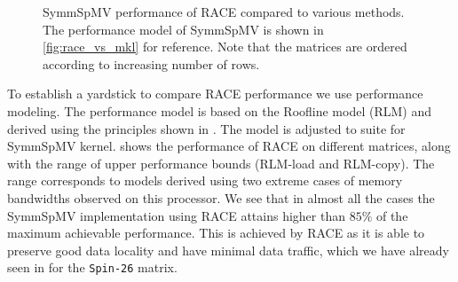 \begin{figure}[tb]
	\caption{\label{fig:symm_spmv_perf} \acrshort{SymmSpMV} performance of \acrshort{RACE} compared to 
		various methods. The performance model of \acrshort{SymmSpMV} is shown in 
		\cref{fig:race_vs_mkl} for reference. Note that the matrices are ordered according 
		to increasing number of rows.}
\end{figure}
To establish a yardstick to compare \acrshort{RACE} performance we use 
performance modeling. The performance model is based on the Roofline  model (RLM)
 \cite{Williams_roofline}  and derived using the principles shown 
 in \cite{Moritz_sell}. The model is adjusted to suite for \acrshort{SymmSpMV}
kernel.  shows the performance of \acrshort{RACE}
on different matrices, along with the range of upper performance bounds 
(RLM-load and RLM-copy). The range corresponds to models derived using two
extreme cases of memory bandwidths observed on this processor. 
We see that in almost all the cases the \acrshort{SymmSpMV} implementation
using \acrshort{RACE} attains higher than $85\%$ of the maximum achievable performance.
This is achieved by \acrshort{RACE} as it is able to preserve good data
locality and have minimal data traffic, which we have already seen in
  for the \texttt{Spin-26} matrix. 
 
